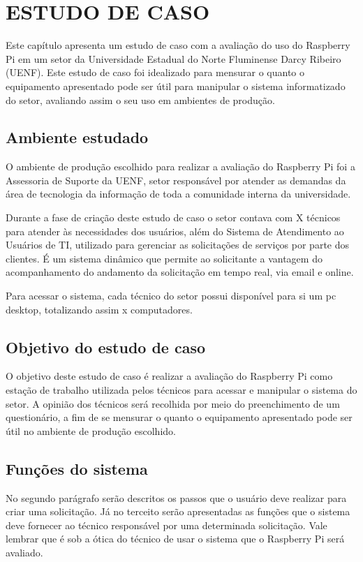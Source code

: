 \chapter{ESTUDO DE CASO}

Este capítulo apresenta um estudo de caso com a avaliação do uso do Raspberry Pi em um setor da Universidade Estadual do Norte Fluminense Darcy Ribeiro (UENF). Este estudo de caso foi idealizado para mensurar o quanto o equipamento apresentado pode ser útil para manipular o sistema informatizado do setor, avaliando assim o seu uso em ambientes de produção.

\section{Ambiente estudado}

O ambiente de produção escolhido para realizar a avaliação do Raspberry Pi foi a Assessoria de Suporte da UENF, setor responsável por atender as demandas da área de tecnologia da informação de toda a comunidade interna da universidade.

Durante a fase de criação deste estudo de caso o setor contava com X técnicos para atender às necessidades dos usuários, além do Sistema de Atendimento ao Usuários de TI, utilizado para gerenciar as solicitações de serviços por parte dos clientes. É um sistema dinâmico que permite ao solicitante a vantagem do acompanhamento do andamento da solicitação em tempo real, via email e online.

Para acessar o sistema, cada técnico do setor possui disponível para si um pc desktop, totalizando assim x computadores.

\section{Objetivo do estudo de caso}

O objetivo deste estudo de caso é realizar a avaliação do Raspberry Pi como estação de trabalho utilizada pelos técnicos para acessar e manipular o sistema do setor. A opinião dos técnicos será recolhida por meio do preenchimento de um questionário, a fim de se mensurar o quanto o equipamento apresentado pode ser útil no ambiente de produção escolhido.

\section{Funções do sistema}

No segundo parágrafo serão descritos os passos que o usuário deve realizar para criar uma solicitação. Já no terceito serão apresentadas as funções que o sistema deve fornecer ao técnico responsável por uma determinada solicitação. Vale lembrar que é sob a ótica do técnico de usar o sistema que o Raspberry Pi será avaliado.

